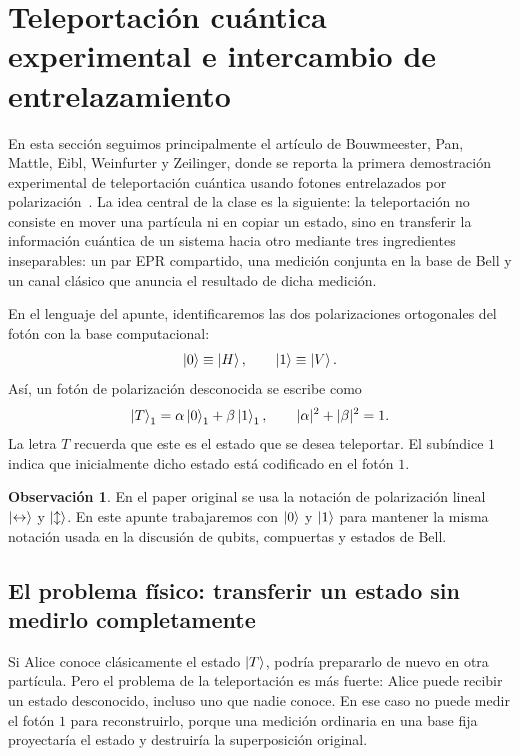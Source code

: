 \documentclass[12pt,a4paper]{article}
\theoremstyle{definition}
\newtheorem{observacion}[definicion]{Observación}
\theoremstyle{plain}
\theoremstyle{remark}
\begin{document}

\section{Teleportación cuántica experimental e intercambio de entrelazamiento}

En esta sección seguimos principalmente el artículo de Bouwmeester, Pan, Mattle, Eibl, Weinfurter y Zeilinger, donde se reporta la primera demostración experimental de teleportación cuántica usando fotones entrelazados por polarización~\cite{Bouwmeester1997}. La idea central de la clase es la siguiente: la teleportación no consiste en mover una partícula ni en copiar un estado, sino en transferir la información cuántica de un sistema hacia otro mediante tres ingredientes inseparables: un par EPR compartido, una medición conjunta en la base de Bell y un canal clásico que anuncia el resultado de dicha medición.

En el lenguaje del apunte, identificaremos las dos polarizaciones ortogonales del fotón con la base computacional:
\begin{equation*}
    \ket{0}\equiv \ket{H},
    \qquad
    \ket{1}\equiv \ket{V}.
\end{equation*}
Así, un fotón de polarización desconocida se escribe como
\begin{equation*}
    \ket{T}_1=\alpha\ket{0}_1+\beta\ket{1}_1,
    \qquad
    |\alpha|^2+|\beta|^2=1.
\end{equation*}
La letra $T$ recuerda que este es el estado que se desea teleportar. El subíndice $1$ indica que inicialmente dicho estado está codificado en el fotón $1$.

\begin{observacion}
En el paper original se usa la notación de polarización lineal $\ket{\leftrightarrow}$ y $\ket{\updownarrow}$. En este apunte trabajaremos con $\ket{0}$ y $\ket{1}$ para mantener la misma notación usada en la discusión de qubits, compuertas y estados de Bell.
\end{observacion}

\subsection{El problema físico: transferir un estado sin medirlo completamente}

Si Alice conoce clásicamente el estado $\ket{T}$, podría prepararlo de nuevo en otra partícula. Pero el problema de la teleportación es más fuerte: Alice puede recibir un estado desconocido, incluso uno que nadie conoce. En ese caso no puede medir el fotón $1$ para reconstruirlo, porque una medición ordinaria en una base fija proyectaría el estado y destruiría la superposición original.
\end{document}

